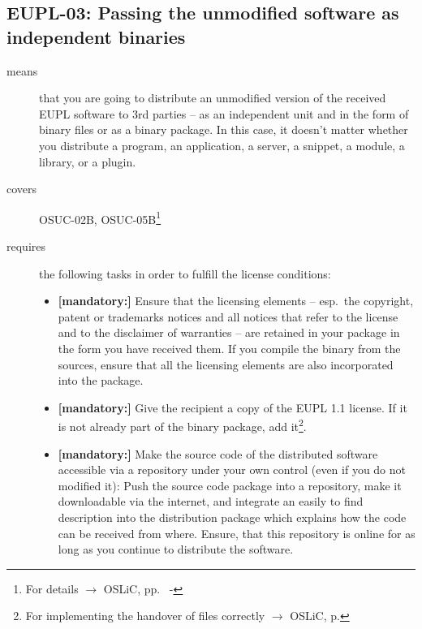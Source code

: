 \subsection{EUPL-03: Passing the unmodified software as independent binaries} 
\label{OSUC-02B-EUPL} \label{OSUC-05B-EUPL}

\begin{description}

\item[means] that you are going to distribute an unmodified version of the
received EUPL software to 3rd parties -- as an independent unit and in the form
of binary files or as a binary package. In this case, it doesn't matter whether
you distribute a program, an application, a server, a snippet, a module, a
library, or a plugin.

\item[covers] OSUC-02B, OSUC-05B\footnote{For details $\rightarrow$
OSLiC, pp.\ \pageref{OSUC-02B-DEF} - \pageref{OSUC-05B-DEF}}

\item[requires] the following tasks in order to fulfill the license conditions:
\begin{itemize}
  
  \item \textbf{[mandatory:]} Ensure that the licensing elements -- esp.\ the
  copyright, patent or trademarks notices and all notices that refer to the
  license and to the disclaimer of warranties -- are retained in your package in
  the form you have received them. If you compile the binary from the sources,
  ensure that all the licensing elements are also incorporated into the package.
  
  \item \textbf{[mandatory:]} Give the recipient a copy of the EUPL 1.1
  license. If it is not already part of the binary package, add
  it\footnote{For implementing the handover of files correctly $\rightarrow$
  OSLiC, p. \pageref{DistributingFilesHint}}.

  \item \textbf{[mandatory:]} Make the source code of the distributed software
  accessible via a repository under your own control (even if you do not
  modified it): Push the source code package into a repository, make it
  downloadable via the internet, and integrate an easily to find description
  into the distribution package which explains how the code can be received from
  where. Ensure, that this repository is online for as long as you continue to
  distribute the software.
  

\end{itemize}
\end{description}
